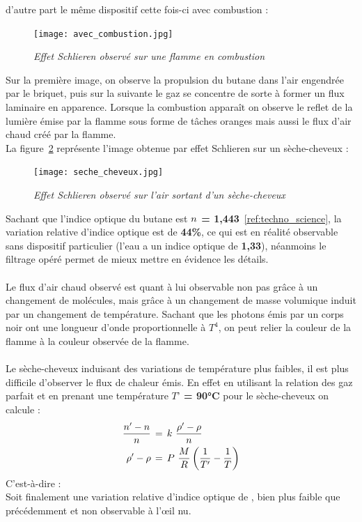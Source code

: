 d'autre part le même dispositif cette fois-ci avec combustion :\\
\begin{figure}[H]
	\centering
	\texttt{[image: avec\_combustion.jpg]}
	\caption{\small{\textit{Effet Schlieren observé sur une flamme en combustion}}}
	\label{fig:avec_combustion}
\end{figure}
Sur la première image, on observe la propulsion du butane dans l’air engendrée par le briquet, puis sur la suivante le gaz se concentre de sorte à former un flux laminaire en apparence. Lorsque la combustion apparaît on observe le reflet de la lumière émise par la flamme sous forme de tâches oranges mais aussi le flux d’air chaud créé par la flamme. \\
La figure~\ref{fig:seche_cheveux} représente l'image obtenue par effet Schlieren sur un sèche-cheveux :
\begin{figure}[H]
	\centering
	\texttt{[image: seche\_cheveux.jpg]}
	\caption{\small{\textit{Effet Schlieren observé sur l'air sortant d'un sèche-cheveux}}}
	\label{fig:seche_cheveux}
\end{figure}
Sachant que l’indice optique du butane est \textbf{$\mathnormal{n}$ = 1,443}~\ref{ref:techno_science}, la variation relative d’indice optique est de \textbf{44\%}, ce qui est en réalité observable sans dispositif particulier (l’eau a un indice optique de \textbf{1,33}), néanmoins le filtrage opéré permet de mieux mettre en évidence les détails.\\ \\
Le flux d’air chaud observé est quant à lui observable non pas grâce à un changement de molécules, mais grâce à un changement de masse volumique induit par un changement de température. Sachant que les photons émis par un corps noir ont une longueur d’onde proportionnelle à $T^{4}$, on peut relier la couleur de la flamme à la couleur observée de la flamme.
\\
\\
Le sèche-cheveux induisant des variations de température plus faibles, il est plus difficile d’observer le flux de chaleur émis. En effet en utilisant la relation des gaz parfait et en prenant une température \textbf{$T’$ = 90°C} pour le sèche-cheveux on calcule :
\begin{align}
	\frac{n'-n}{n} \,&= \, k \,\,\frac{\rho' - \rho}{n}
	\label{indice_rho}\\
	\rho' - \rho \,&= \, P \,\,\frac{M}{R}\,\bigg{(}\frac{1}{T'}-\frac{1}{T}\bigg{)}
	\label{indice_pression}
\end{align}
C'est-à-dire :\\
Soit finalement une variation relative d’indice optique de , bien plus faible que précédemment et non observable à l'œil nu.\\ \\
